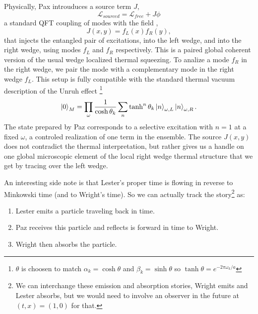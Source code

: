 \documentclass[12pt,a4paper]{article}
\begin{document}
Physically, Pax introuduces a source term $J$,
\begin{equation}
\mathscr{L}_{sourced} = \mathscr{L}_{free} + J\phi
\end{equation}
a standard QFT coupling of modes with the field \cite{Schwinger_1966} \cite{ryder1996quantum},
\begin{equation}
 J(x,y) = f_L(x) f_R(y), 
\end{equation}
that injects the entangled pair of excitations, into the left wedge, and into the right wedge, using modes $f_L$ and $f_R$ respectively.
This is a paired global coherent version of the usual wedge localized thermal squeezing. To analize a mode $f_R$ in the right wedge, we pair the mode with a complementary mode in the right wedge $f_L$.  This setup is fully compatible with the standard thermal vacuum description of the Unruh effect \footnote{$\theta$ is choosen to match $\alpha_k = \cosh{\theta}$ and $\beta_k = \sinh{\theta}$ so $\tanh{\theta} = e^{-2\pi\omega_k / a}$}
\[
 \ket{0}_M = \prod_{\omega} \frac{1}{\cosh{\theta_k}} \sum_n \tanh^n{\theta_k} \ket{n}_{\omega,L} \ket{n}_{\omega,R}.
\] The state prepared by Paz corresponds to a selective excitation with $n=1$ at a fixed $\omega$, a controled realization of one term in the ensemble.  The source $J(x,y)$ does not contradict the thermal interpretation, but rather gives us a handle on one global microscopic element of the local right wedge thermal structure that we get by tracing over the left wedge.

An interesting side note is that Lester's proper time is flowing in reverse to Minkowski time (and to Wright's time).  So we can actually track the story\footnote{We can interchange these emission and absorption stories, Wright emits and Lester absorbs, but we would need to involve an observer in the future at $(t,x) = (1,0)$ for that.} as:
\begin{enumerate}
\item Lester emits a particle traveling back in time.
\item Paz receives this particle and reflects is forward in time to Wright.
\item Wright then absorbs the particle.
\end{enumerate}
\end{document}
